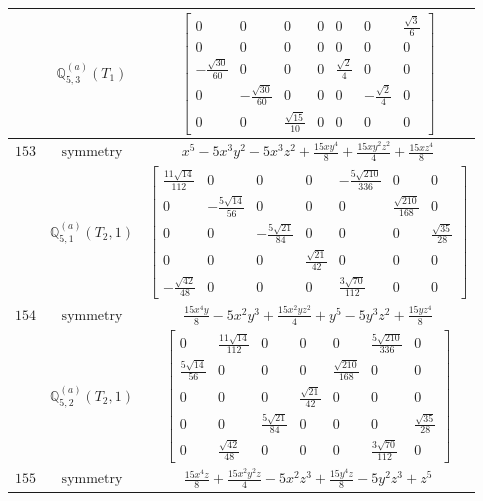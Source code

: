 \documentclass[fleqn,8pt,landscape]{jsarticle}
\begin{document}
\begin{longtable}{ccc}
$  $ & $ \mathbb{Q}_{5,3}^{(a)}(T_{1}) $ & $ \begin{bmatrix} 0 & 0 & 0 & 0 & 0 & 0 & \frac{\sqrt{3}}{6} \\ 0 & 0 & 0 & 0 & 0 & 0 & 0 \\ - \frac{\sqrt{30}}{60} & 0 & 0 & 0 & \frac{\sqrt{2}}{4} & 0 & 0 \\ 0 & - \frac{\sqrt{30}}{60} & 0 & 0 & 0 & - \frac{\sqrt{2}}{4} & 0 \\ 0 & 0 & \frac{\sqrt{15}}{10} & 0 & 0 & 0 & 0 \end{bmatrix} $ \\ \hline
$ 153 $ & $ \text{symmetry} $ & $ x^{5} - 5 x^{3} y^{2} - 5 x^{3} z^{2} + \frac{15 x y^{4}}{8} + \frac{15 x y^{2} z^{2}}{4} + \frac{15 x z^{4}}{8} $ \\
$  $ & $ \mathbb{Q}_{5,1}^{(a)}(T_{2},1) $ & $ \begin{bmatrix} \frac{11 \sqrt{14}}{112} & 0 & 0 & 0 & - \frac{5 \sqrt{210}}{336} & 0 & 0 \\ 0 & - \frac{5 \sqrt{14}}{56} & 0 & 0 & 0 & \frac{\sqrt{210}}{168} & 0 \\ 0 & 0 & - \frac{5 \sqrt{21}}{84} & 0 & 0 & 0 & \frac{\sqrt{35}}{28} \\ 0 & 0 & 0 & \frac{\sqrt{21}}{42} & 0 & 0 & 0 \\ - \frac{\sqrt{42}}{48} & 0 & 0 & 0 & \frac{3 \sqrt{70}}{112} & 0 & 0 \end{bmatrix} $ \\ \hline
$ 154 $ & $ \text{symmetry} $ & $ \frac{15 x^{4} y}{8} - 5 x^{2} y^{3} + \frac{15 x^{2} y z^{2}}{4} + y^{5} - 5 y^{3} z^{2} + \frac{15 y z^{4}}{8} $ \\
$  $ & $ \mathbb{Q}_{5,2}^{(a)}(T_{2},1) $ & $ \begin{bmatrix} 0 & \frac{11 \sqrt{14}}{112} & 0 & 0 & 0 & \frac{5 \sqrt{210}}{336} & 0 \\ \frac{5 \sqrt{14}}{56} & 0 & 0 & 0 & \frac{\sqrt{210}}{168} & 0 & 0 \\ 0 & 0 & 0 & \frac{\sqrt{21}}{42} & 0 & 0 & 0 \\ 0 & 0 & \frac{5 \sqrt{21}}{84} & 0 & 0 & 0 & \frac{\sqrt{35}}{28} \\ 0 & \frac{\sqrt{42}}{48} & 0 & 0 & 0 & \frac{3 \sqrt{70}}{112} & 0 \end{bmatrix} $ \\ \hline
$ 155 $ & $ \text{symmetry} $ & $ \frac{15 x^{4} z}{8} + \frac{15 x^{2} y^{2} z}{4} - 5 x^{2} z^{3} + \frac{15 y^{4} z}{8} - 5 y^{2} z^{3} + z^{5} $ \\

\end{longtable}
\end{document}
